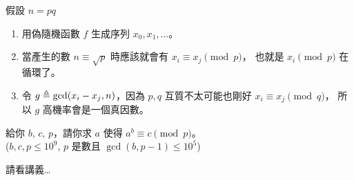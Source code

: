 \documentclass[standalone]{beamer}
\begin{document}
\begin{frame}{}
  假設 $n = pq$ \pause
  \begin{enumerate}[<+->]
    \item 用偽隨機函數 $f$ 生成序列 $x_0, x_1, \dots $。
    \item 當產生的數 $n \equiv \sqrt{p}$ 時應該就會有 $x_i \equiv x_j \pmod{p}$，
      也就是 $x_i \pmod{p}$ 在循環了。
    \item 令 $g \triangleq \gcd(x_i - x_j, n)$，因為 $p, q$ 互質不太可能也剛好 $x_i \equiv x_j \pmod{q}$，
      所以 $g$ 高機率會是一個真因數。
  \end{enumerate}
\end{frame}

\begin{frame}{}
  \begin{problem}
    給你 $b$, $c$, $p$，請你求 $a$ 使得 $a^b \equiv c \pmod{p}$。\\
    ($b, c, p \leq 10^9$, $p$ 是數且 $\gcd(b, p-1) \leq 10^5$)
  \end{problem} \pause

  請看講義…
\end{frame}
\end{document}

